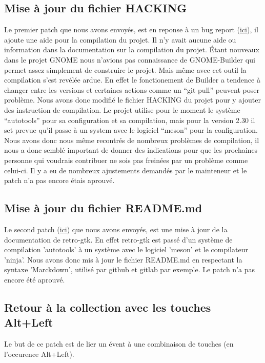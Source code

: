 \documentclass[12pt]{report}
\begin{document}
\subsection{Mise à jour du fichier HACKING}
Le premier patch que nous avons envoyés, est en reponse à un bug report
(\href{http://bugzilla.gnome.org/show_bug.cgi?id=788692}{ici}), il ajoute une
aide pour la compilation du projet. \newline
Il n'y avait aucune aide ou information dans la documentation sur la compilation
du projet. Étant nouveaux dans le projet GNOME nous n'avions pas connaissance de 
GNOME-Builder qui permet assez simplement de construire le projet. Mais
même avec cet outil la compilation s'est revélée ardue. En effet 
le fonctionement de Builder a tendence à changer entre les versions et certaines
actions comme un ``git pull'' peuvent poser problème.
Nous avons donc modifié le fichier HACKING du projet pour y ajouter des 
instruction de compilation. \newline
Le projet utilise pour le moment le système ``autotools'' pour sa configuration et 
sa compilation, mais pour la version 2.30 il set prevue qu'il passe à un system
avec le logiciel ``meson'' pour la configuration. \newline
Nous avons donc nous même recontrés de nombreux problèmes de compilation,
il nous a donc semblé important de donner des indications pour que les 
prochaines personne qui voudrais contribuer ne sois pas freinées par un 
problème comme celui-ci.
Il y a eu de nombreux ajustements demandés par le mainteneur et le patch n'a 
pas encore étais aprouvé. \newline

\subsection{Mise à jour du fichier README.md}
Le second patch (\href{http://bugzilla.gnome.org/show_bug.cgi?id=790454}{ici}) 
que nous avons envoyés, est une mise à jour de la documentation de retro-gtk.
En effet retro-gtk est passé d'un système de compilation 'autotools' à un
système avec le logiciel 'meson' et le compilateur 'ninja'.
Nous avons donc mis à jour le fichier README.md en respectant la syntaxe
'Marckdown', utilisé par github et gitlab par exemple.
Le patch n'a pas encore été aprouvé. \newline

\subsection{Retour à la collection avec les touches Alt+Left}
Le but de ce patch est de lier un évent à une combinaison de touches
(en l'occurence Alt+Left).
\end{document}
